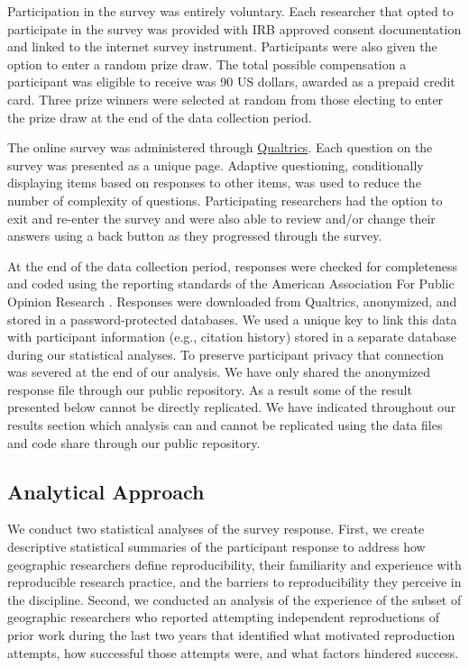 \documentclass[]{interact}
\theoremstyle{plain}%
\theoremstyle{definition}
\theoremstyle{remark}
\begin{document}
Participation in the survey was entirely voluntary. 
Each researcher that opted to participate in the survey was provided with IRB approved consent documentation and linked to the internet survey instrument. 
Participants were also given the option to enter a random prize draw. 
The total possible compensation a participant was eligible to receive was 90 US dollars, awarded as a prepaid credit card.
Three prize winners were selected at random from those electing to enter the prize draw at the end of the data collection period.

The online survey was administered through \href{https://www.qualtrics.com/}{Qualtrics}. 
Each question on the survey was presented as a unique page. 
Adaptive questioning, conditionally displaying items based on responses to other items, was used to reduce the number of complexity of questions.
Participating researchers had the option to exit and re-enter the survey and were also able to review and/or change their answers using a back button as they progressed through the survey.

At the end of the data collection period, responses were checked for completeness and coded using the reporting standards of the American Association For Public Opinion Research \citep{aaporstandards}.
Responses were downloaded from Qualtrics, anonymized, and stored in a password-protected databases.
We used a unique key to link this data with participant information (e.g., citation history) stored in a separate database during our statistical analyses. 
To preserve participant privacy that connection was severed at the end of our analysis.
We have only shared the anonymized response file through our public repository. 
As a result some of the result presented below cannot be directly replicated. 
We have indicated throughout our results section which analysis can and cannot be replicated using the data files and code share through our public repository. 

\subsection*{Analytical Approach}
We conduct two statistical analyses of the survey response.
First, we create descriptive statistical summaries of the participant response to address how geographic researchers define reproducibility, their familiarity and experience with reproducible research practice, and the barriers to reproducibility they perceive in the discipline.
Second, we conducted an analysis of the experience of the subset of geographic researchers who reported attempting independent reproductions of prior work during the last two years that identified what motivated reproduction attempts, how successful those attempts were, and what factors hindered success.
\end{document}
